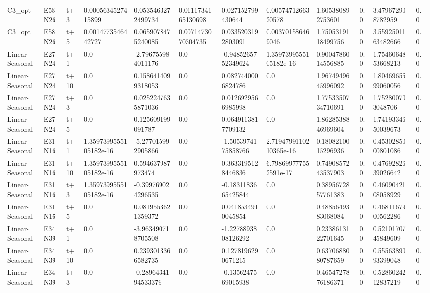 \begin{landscape}
\begin{longtable}{llllllllllll}
C3\_opt & E58N26 & t+3 & 0.0005634527415899 & 0.0535463272499734 & 0.0111734165130698 & 0.027152799430644 & 0.0057471266320578 & 1.605380892753601 & 0.0 & 3.479672908782959 & 0.0 \\
C3\_opt & E58N26 & t+5 & 0.0014773546442727 & 0.0659078475240085 & 0.0071473070304735 & 0.0335203192803091 & 0.003701586469046 & 1.7505319118499756 & 0.0 & 3.5592501163482666 & 0.0 \\
Linear-Seasonal & E27N24 & t+1 & 0.0 & -2.796755984011176 & 0.0 & -0.9485265752349624 & 1.3597399555105182e-16 & 0.9004786014556885 & 0.0 & 1.7546064853668213 & 0.0 \\
Linear-Seasonal & E27N24 & t+10 & 0.0 & 0.1586414099318053 & 0.0 & 0.0827440006824786 & 0.0 & 1.9674949645996092 & 0.0 & 1.8046965599060056 & 0.0 \\
Linear-Seasonal & E27N24 & t+3 & 0.0 & 0.0252247635871036 & 0.0 & 0.0126929566985998 & 0.0 & 1.7753350734710691 & 0.0 & 1.752800703048706 & 0.0 \\
Linear-Seasonal & E27N24 & t+5 & 0.0 & 0.125609199091787 & 0.0 & 0.0649113817709132 & 0.0 & 1.8628538846969604 & 0.0 & 1.7419334650039673 & 0.0 \\
Linear-Seasonal & E31N16 & t+1 & 1.3597399555105182e-16 & -5.277015992905866 & 0.0 & -1.5053974175858766 & 2.7194799110210365e-16 & 0.1808210015296936 & 0.0 & 0.4530285000801086 & 0.0 \\
Linear-Seasonal & E31N16 & t+10 & 1.3597399555105182e-16 & 0.594637987973474 & 0.0 & 0.3633195128446836 & 6.798699777552591e-17 & 0.7490857243537903 & 0.0 & 0.4769282639026642 & 0.0 \\
Linear-Seasonal & E31N16 & t+3 & 1.3597399555105182e-16 & -0.399769024296535 & 0.0 & -0.1831183665425844 & 0.0 & 0.3895672857761383 & 0.0 & 0.4609042108058929 & 0.0 \\
Linear-Seasonal & E31N16 & t+5 & 0.0 & 0.0819553621359372 & 0.0 & 0.0418534910045854 & 0.0 & 0.4885649383068084 & 0.0 & 0.4681167900562286 & 0.0 \\
Linear-Seasonal & E34N39 & t+1 & 0.0 & -3.963490718705508 & 0.0 & -1.2278893808126292 & 0.0 & 0.2338613122701645 & 0.0 & 0.5210170745849609 & 0.0 \\
Linear-Seasonal & E34N39 & t+10 & 0.0 & 0.2393013366582735 & 0.0 & 0.1278196290671215 & 0.0 & 0.6370688080787659 & 0.0 & 0.5556389093399048 & 0.0 \\
Linear-Seasonal & E34N39 & t+3 & 0.0 & -0.2896434194533379 & 0.0 & -0.1356247569015938 & 0.0 & 0.4654727876186371 & 0.0 & 0.5286024212837219 & 0.0 \\

\end{longtable}
\end{landscape}
